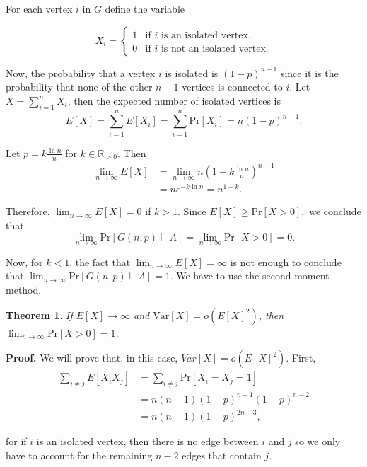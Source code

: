 \documentclass[12pt]{article}
\newtheorem*{theorem*}{Theorem}
\theoremstyle{definition}
\theoremstyle{remark}
\def\R{\ensuremath{\mathbb{R}}}
\def\Pr{\ensuremath{\mbox{Pr}}}
\begin{document}
For each vertex $i$ in $G$ define the variable 

\[X_i = 
\left\{
	\begin{array}{ll}
		1  & \mbox{if } i \text{ is an isolated vertex,} \\
		0 & \mbox{if } i \text{ is not an isolated vertex.}
	\end{array}
\right.
\]

Now, the probability that a vertex $i$ is isolated is $(1 - p)^{n - 1}$ since it is the probability that none of the other $n - 1$ vertices is connected to $i$. Let $X = \sum_{i = 1}^n X_i$, then the expected number of isolated vertices is
 \[E[X] = \sum_{i = 1}^{n} E[X_i] = \sum_{i = 1}^{n} \Pr[X_i] = n(1 - p)^{n - 1}.\]

Let $\displaystyle{p = k\frac{\ln n}{n}}$ for $k \in \R_{>0}$. Then
\begin{align*}
    \lim_{n \to \infty} E[X] &= \lim_{n \to \infty} n\left(1 - k\frac{\ln n}{n}\right)^{n - 1} \\
    &= ne^{-k\ln n} = n^{1 - k}.
\end{align*}

Therefore, $\lim_{n \to \infty} E[X] = 0$ if $k > 1$. Since \(E[X] \geq \Pr[X > 0],\) we conclude that \[\lim_{n \to \infty} \Pr[G(n, p) \vDash A] =  \lim_{n \to \infty} \Pr[X > 0] = 0.\] \par
Now, for $k < 1$, the fact that $\lim_{n \to \infty} E[X] = \infty$ is not enough to conclude that \(\lim_{n \to \infty} \Pr[G(n, p) \vDash A] = 1\). We have to use the second moment method. \par

\begin{theorem*}
    If $E[X] \to \infty$ and $\text{Var}[X] = o(E[X]^2)$, then $\lim_{n \to \infty} \Pr[X > 0] = 1$. \cite{alon2016probabilistic}
\end{theorem*}

\textbf{Proof. } We will prove that, in this case, $Var[X] = o(E[X]^2)$. First, 
\begin{align*}
    \sum_{i \neq j}E[X_iX_j] &= \sum_{i \neq j} \Pr[X_i = X_j = 1] \\
    &= n(n - 1)(1 - p)^{n -1}(1 - p)^{n - 2} \\ &= n(n - 1)(1 - p)^{2n - 3},
\end{align*}

for if $i$ is an isolated vertex, then there is no edge between $i$ and $j$ so we only have to account for the remaining $n - 2$ edges that contain $j$.  \par
\end{document}
